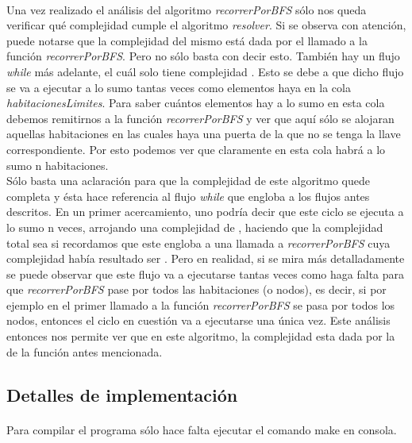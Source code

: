 \paragraph{}
Una vez realizado el análisis del algoritmo \textit{recorrerPorBFS} sólo nos queda verificar qué complejidad cumple el algoritmo \textit{resolver}. Si se observa con atención, puede notarse que la complejidad del mismo está dada por el llamado a la función \textit{recorrerPorBFS}. Pero no sólo basta con decir esto. También hay un flujo \textit{while} más adelante, el cuál solo tiene complejidad . Esto se debe a que dicho flujo se va a ejecutar a lo sumo tantas veces como elementos haya en la cola \textit{habitacionesLimites}. Para saber cuántos elementos hay a lo sumo en esta cola debemos remitirnos a la función \textit{recorrerPorBFS} y ver que aquí sólo se alojaran aquellas habitaciones en las cuales haya una puerta de la que no se tenga la llave correspondiente. Por esto podemos ver que claramente en esta cola habrá a lo sumo n habitaciones.\\
Sólo basta una aclaración para que la complejidad de este algoritmo quede completa y ésta hace referencia al flujo \textit{while} que engloba a los flujos antes descritos. En un primer acercamiento, uno podría decir que este ciclo se ejecuta a lo sumo n veces, arrojando una complejidad de , haciendo que la complejidad total sea  si recordamos que este engloba a una llamada a \textit{recorrerPorBFS} cuya complejidad había resultado ser . Pero en realidad, si se mira más detalladamente se puede observar que este flujo va a ejecutarse tantas veces como haga falta para que \textit{recorrerPorBFS} pase por todos las habitaciones (o nodos), es decir, si por ejemplo en el primer llamado a la función \textit{recorrerPorBFS} se pasa por todos los nodos, entonces el ciclo en cuestión va a ejecutarse una única vez. Este análisis entonces nos permite ver que en este algoritmo, la complejidad esta dada por la de la función antes mencionada.

\subsection{Detalles de implementación}

\paragraph{}
Para compilar el programa sólo hace falta ejecutar el comando make en consola.

